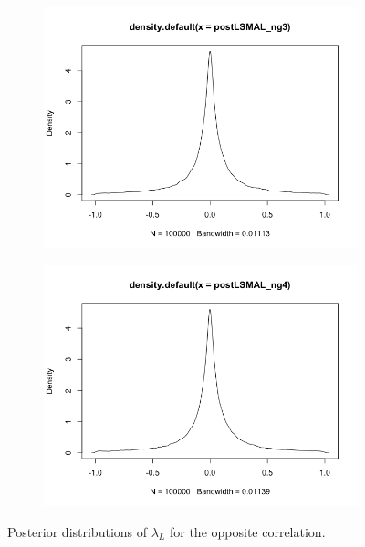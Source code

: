 \documentclass[mstat,12pt]{unswthesis}  %
\numberwithin{equation}{section}
\begin{document}
\begin{figure}[h]
\begin{subfigure}{.32\textwidth}
  \centering
  \includegraphics[width=\linewidth]{postLSMALng3.png}  
  \label{fig:sub-third}
\end{subfigure}
\begin{subfigure}{.32\textwidth}
  \centering
  \includegraphics[width=\linewidth]{postLSMALng4.png}  
  \label{fig:sub-fourth}
\end{subfigure}
\caption{Posterior distributions of $\lambda_L$ for the opposite correlation.}
\label{fig:fig}
\end{figure}
\end{document}
